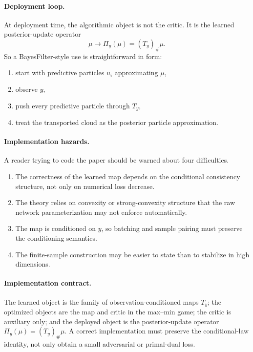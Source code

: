 \documentclass[11pt]{report}
\newcommand{\pushf}[2]{\left(#1\right)_{\#} #2}
\begin{document}
\paragraph{Deployment loop.}
At deployment time, the algorithmic object is not the critic.  It is the learned
posterior-update operator
\begin{equation}
\mu \longmapsto \Pi_y(\mu)=\pushf{T_y}{\mu}.
\label{eq:aljarrah-deployment-loop}
\end{equation}
So a BayesFilter-style use is straightforward in form:
\begin{enumerate}[label=(\arabic*)]
  \item start with predictive particles $u_i$ approximating $\mu$,
  \item observe $y$,
  \item push every predictive particle through $T_y$,
  \item treat the transported cloud as the posterior particle approximation.
\end{enumerate}

\paragraph{Implementation hazards.}
A reader trying to code the paper should be warned about four difficulties.
\begin{enumerate}[label=(\roman*)]
  \item The correctness of the learned map depends on the conditional consistency
  structure, not only on numerical loss decrease.
  \item The theory relies on convexity or strong-convexity structure that the raw
  network parameterization may not enforce automatically.
  \item The map is conditioned on $y$, so batching and sample pairing must preserve
  the conditioning semantics.
  \item The finite-sample construction may be easier to state than to stabilize in
  high dimensions.
\end{enumerate}

\paragraph{Implementation contract.}
The learned object is the family of observation-conditioned maps $T_y$; the optimized
objects are the map and critic in the max--min game; the critic is auxiliary only; and
the deployed object is the posterior-update operator $\Pi_y(\mu)=\pushf{T_y}{\mu}$.
A correct implementation must preserve the conditional-law identity, not only obtain a
small adversarial or primal-dual loss.
\end{document}
